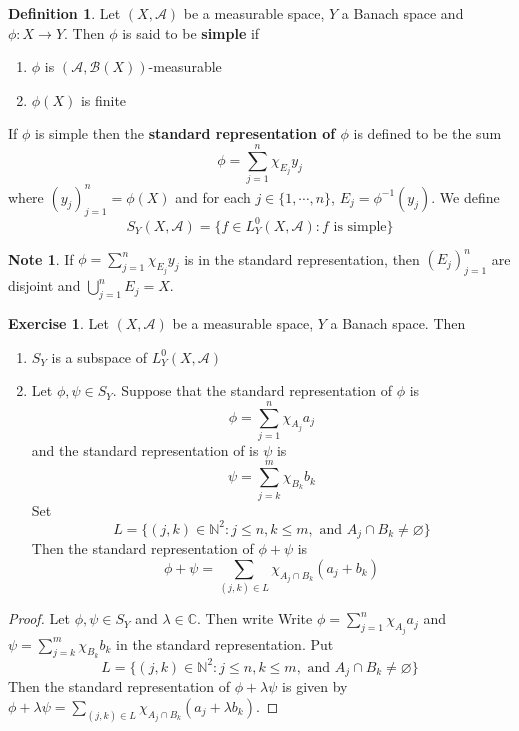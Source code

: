 \documentclass{book}
\theoremstyle{definition}
\newtheorem{defn}[definition]{Definition}
\newtheorem{note}[definition]{Note}
\newtheorem{ex}[definition]{Exercise}
\newcommand{\lam}{\lambda}
\newcommand{\C}{\mathbb{C}}
\newcommand{\N}{\mathbb{N}}
\newcommand{\MA}{\mathcal{A}}
\newcommand{\MB}{\mathcal{B}}
\newcommand{\ld}[1]{\label{defn:#1}}
\DeclareMathOperator*{\0}{\mbf{0}}
\DeclareMathOperator*{\1}{\mbf{1}}
\begin{document}
	\begin{defn} \ld{00000} 
		Let $(X, \MA)$ be a measurable space, $Y$ a Banach space and $\phi: X \rightarrow Y$. Then $\phi$ is said to be \textbf{simple} if 
		\begin{enumerate}
			\item $\phi$ is $(\MA, \MB(X))$-measurable
			\item $\phi(X)$ is finite
		\end{enumerate}
		If $\phi$ is simple then the \textbf{standard representation of $\phi$} is defined to be the sum $$\phi = \sum\limits_{j=1}^n \chi_{E_j}y_j$$ where $(y_j)_{j=1}^n = \phi(X)$ and for each $j \in \{1, \cdots, n\}$, $E_j = \phi^{-1}(y_j)$. We define $$S_Y(X, \MA) = \{f \in L_Y^0(X, \MA): f \text{ is simple}\}$$
	\end{defn}
	
	\begin{note}
		If $\phi = \sum\limits_{j=1}^n \chi_{E_j}y_j$ is in the standard representation, then $(E_j)_{j=1}^n$ are disjoint and $\bigcup\limits_{j=1}^n E_j = X$.
	\end{note}

	\begin{ex}
		Let $(X, \MA)$ be a measurable space, $Y$ a Banach space. Then 
		\begin{enumerate}
			\item $S_Y $ is a subspace of $L^0_Y(X, \MA)$
			\item Let $\phi, \psi \in S_Y$. Suppose that the standard representation of $\phi$ is 
			$$\phi = \sum\limits_{j=1}^n\chi_{A_j}a_j$$ 
			and the standard representation of is $\psi$ is 
			$$\psi = \sum\limits_{j=k}^m\chi_{B_k}b_k$$ 
			Set
			$$L = \{(j,k) \in \N^2: j \leq n, k \leq m, \text{ and } A_j \cap B_k \neq \varnothing\}$$  
			Then the standard representation of $\phi + \psi$ is 
			$$\phi + \psi = \sum\limits_{(j,k) \in L} \chi_{A_j \cap B_k}(a_j + b_k)$$
		\end{enumerate} 
	\end{ex}

	\begin{proof}
		Let $\phi, \psi \in S_Y$ and $\lam \in \C$. Then write Write $\phi = \sum\limits_{j=1}^n\chi_{A_j}a_j$ and $\psi = \sum\limits_{j=k}^m\chi_{B_k}b_k$ in the standard representation. Put $$L = \{(j,k) \in \N^2: j \leq n, k \leq m, \text{ and } A_j \cap B_k \neq \varnothing\}$$ 
		Then the standard representation of $\phi + \lam \psi$ is given by  $\phi + \lam \psi = \sum\limits_{(j,k) \in L} \chi_{A_j \cap B_k}(a_j + \lam b_k)$.
		
	\end{proof}
	
\end{document}
